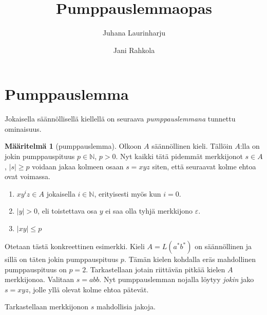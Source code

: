 \documentclass[a4paper,11pt]{article}
\title{Pumppauslemmaopas}
\author{Juhana Laurinharju \and Jani Rahkola}
\theoremstyle{definition}
\newtheorem*{definition}{Määritelmä}
\newcommand{\Nat}{\mathbb{N}}
\begin{document}
\maketitle


\section*{Pumppauslemma}

Jokaisella säännöllisellä kiellellä on seuraava \emph{pumppauslemmana} tunnettu
ominaisuus.

\begin{definition}[pumppauslemma]
    Olkoon $A$ säännöllinen kieli. Tällöin $A$:lla on jokin pumppauspituus $p
    \in \Nat$, $p > 0$. Nyt kaikki tätä pidemmät merkkijonot $s \in A$, $|s|
    \geq p$ voidaan jakaa kolmeen osaan $s = xyz$ siten, että seuraavat kolme
    ehtoa ovat voimassa.

    \begin{enumerate}
        \item $xy^iz \in A$ jokaisella $i \in \Nat$, erityisesti myös kun $i = 0$.
        \item $|y| > 0$, eli toistettava osa $y$ ei saa olla tyhjä merkkijono $\varepsilon$.
        \item $|xy| \leq p$
    \end{enumerate}
\end{definition}

Otetaan tästä konkreettinen esimerkki. Kieli $A = L(a^*b^*)$ on säännöllinen ja
sillä on täten jokin pumppauspituus $p$. Tämän kielen kohdalla eräs mahdollinen
pumppauspituus on $p = 2$. Tarkastellaan jotain riittävän pitkää kielen $A$
merkkijonoa. Valitaan $s = abb$. Nyt pumppauslemman nojalla löytyy \emph{jokin}
jako $s = xyz$, jolle yllä olevat kolme ehtoa pätevät.

Tarkastellaan merkkijonon $s$ mahdollisia jakoja.
\end{document}
